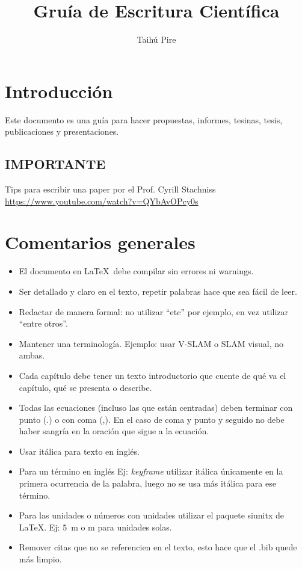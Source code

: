 \documentclass[a4paper,	11pt]{article}
\begin{document}
\title{Gruía de Escritura Científica}
\author{Taihú Pire}


\maketitle

\tableofcontents

\section{Introducción}

Este documento es una guía para hacer propuestas, informes, tesinas, tesis, publicaciones y presentaciones.

\subsection{IMPORTANTE}
Tips para escribir una paper por el Prof. Cyrill Stachniss \url{https://www.youtube.com/watch?v=QYbAvOPcy0s}

\section{Comentarios generales}
%
\begin{itemize}
    \item El documento en \LaTeX~debe compilar sin errores ni warnings.

    \item Ser detallado y claro en el texto, repetir palabras hace que sea fácil de leer.

    \item Redactar de manera formal: no utilizar ``etc'' por ejemplo, en vez utilizar ``entre otros''.

    \item Mantener una terminología. Ejemplo: usar V-SLAM o SLAM visual, no ambas.

    \item Cada capítulo debe tener un texto introductorio que cuente de qué va el capítulo, qué se presenta o describe.
    
    \item Todas las ecuaciones (incluso las que están centradas) deben terminar con punto (.) o con coma (,). En el caso de coma y punto y seguido no debe haber sangría en la oración que sigue a la ecuación.

    \item Usar itálica para texto en inglés.

    \item Para un término en inglés Ej: \emph{keyframe} utilizar itálica únicamente en la primera ocurrencia de la palabra, luego no se usa más itálica para ese término.

    \item Para las unidades o números con unidades utilizar el paquete siunitx de \LaTeX. Ej: \SI{5}{\meter} o \si{\meter} para unidades solas.

    \item Remover citas que no se referencien en el texto, esto hace que el .bib quede más limpio.
\end{itemize}
\end{document}
